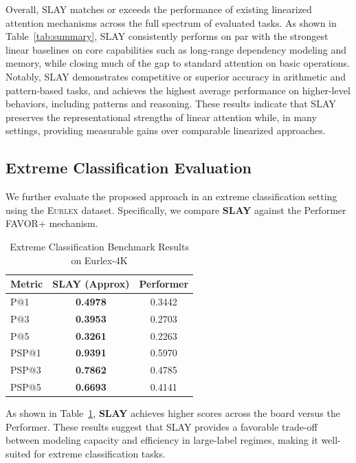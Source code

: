 \documentclass{article}
\begin{document}
Overall, SLAY matches or exceeds the performance of existing linearized attention mechanisms across the full spectrum of evaluated tasks. As shown in Table~\ref{tab:summary}, SLAY consistently performs on par with the strongest linear baselines on core capabilities such as long‑range dependency modeling and memory, while closing much of the gap to standard attention on basic operations. Notably, SLAY demonstrates competitive or superior accuracy in arithmetic and pattern‑based tasks, and achieves the highest average performance on higher‑level behaviors, including patterns and reasoning. These results indicate that SLAY preserves the representational strengths of linear attention while, in many settings, providing measurable gains over comparable linearized approaches.

\subsection{Extreme Classification Evaluation}
\label{subsec:extreme-classification}

We further evaluate the proposed approach in an extreme classification setting using the \textsc{Eurlex} dataset. Specifically, we compare \textbf{SLAY} against the Performer FAVOR+ mechanism.

\begin{table}[htbp]
\centering
\caption{Extreme Classification Benchmark Results on Eurlex-4K}
\label{tab:extreme_results}
\begin{tabular}{lcc}
\toprule
Metric & SLAY (Approx) & Performer \\
\midrule
P@1 & \textbf{0.4978} & 0.3442 \\
P@3 & \textbf{0.3953} & 0.2703 \\
P@5 & \textbf{0.3261} & 0.2263 \\
PSP@1 & \textbf{0.9391} & 0.5970 \\
PSP@3 & \textbf{0.7862} & 0.4785 \\
PSP@5 & \textbf{0.6693} & 0.4141 \\
\bottomrule
\end{tabular}
\end{table}

As shown in Table~\ref{tab:extreme_results}, \textbf{SLAY} achieves higher scores across the board versus the Performer. These results suggest that SLAY provides a favorable trade-off between modeling capacity and efficiency in large-label regimes, making it well-suited for extreme classification tasks.
\end{document}
